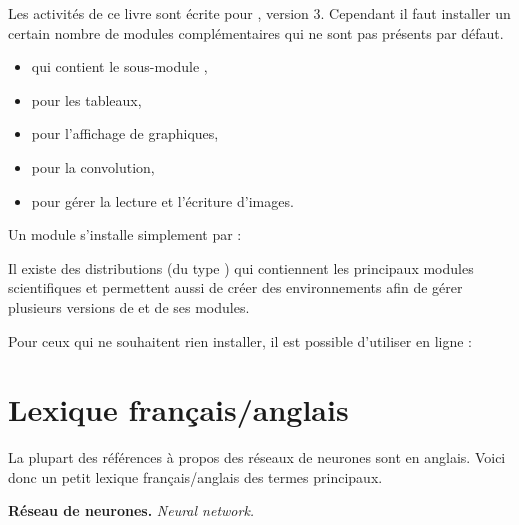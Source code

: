 \documentclass[11pt,class=report,crop=false]{standalone}
\begin{document}
Les activités de ce livre sont écrite pour \Python{}, version 3.
Cependant il faut installer un certain nombre de modules complémentaires qui ne sont pas présents par défaut.
\begin{itemize}
  \item {} qui contient le sous-module ,
  \item {} pour les tableaux,
  \item {} pour l'affichage de graphiques,
  \item {} pour la convolution,  
  \item {} pour gérer la lecture et l'écriture d'images.
 
\end{itemize}  

Un module s'installe simplement par :


Il existe des distributions \Python{} (du type ) qui contiennent les principaux modules scientifiques et permettent aussi de créer des \og{}environnements\fg{} afin de gérer plusieurs versions
de \Python{} et de ses modules.

Pour ceux qui ne souhaitent rien installer, il est possible d'utiliser \tensorflow{} en ligne :



\section{Lexique français/anglais}

La plupart des références à propos des réseaux de neurones sont en anglais. Voici donc un petit lexique français/anglais des termes principaux.

\textbf{Réseau de neurones.} \emph{Neural network.}
\end{document}

